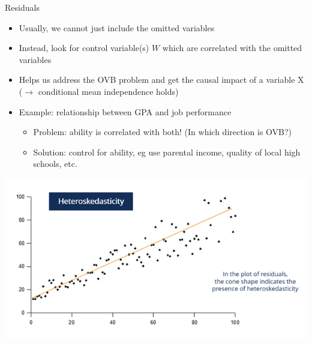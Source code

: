 \documentclass[aspectratio=169]{beamer}
\begin{document}
\begin{frame}{Residuals}
    \begin{itemize}
        \item Usually, we cannot just include the omitted variables
        \item Instead, look for control variable(s) $W$ which are correlated with the omitted variables
        \item Helps us address the OVB problem and get the causal impact of a variable X ($\to$ conditional mean independence holds)
        \item Example: relationship between GPA and job performance
        \begin{itemize}
            \item Problem: ability is correlated with both! (In which direction is OVB?)
            \item Solution: control for ability, eg use parental income, quality of local high schools, etc.
        \end{itemize}
    \end{itemize}
\end{frame}

\begin{frame}
    \centering
    \includegraphics[width = .75\textwidth,keepaspectratio]{./figs/heteroskedasticity.png}
\end{frame}
\end{document}
